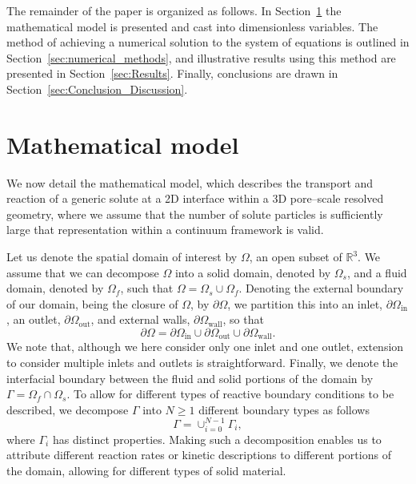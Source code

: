 \documentclass[preprint, 1p, authoryear]{elsarticle}
\begin{document}
The remainder of the paper is organized as follows. In Section~\ref{sec:Mathematical_Model} the 
mathematical model is presented and cast into dimensionless variables. The method of achieving a 
numerical solution to the system of equations is outlined in Section~\ref{sec:numerical_methods}, and 
illustrative results using this method are presented in Section~\ref{sec:Results}.  Finally, conclusions are drawn in 
Section~\ref{sec:Conclusion_Discussion}.

\section{Mathematical model}
\label{sec:Mathematical_Model}
We now detail  the mathematical model, which describes the transport and reaction of a generic solute at a 2D interface within a 3D pore--scale resolved geometry, where we assume that the number of solute particles is sufficiently large  that representation within a continuum framework is valid. 



Let us denote the spatial domain of interest by $\Omega$, an open subset of $\mathbb{R}^3$. We assume that we can decompose $\Omega$ into a solid domain, denoted by $\Omega_s$, and a fluid domain, denoted by $\Omega_f$, such that   $\Omega = \Omega_s \cup \Omega_f$. Denoting the  external boundary of our domain, being the closure of $\Omega$, by $\partial \Omega$, we partition this into an inlet, $\partial \Omega_{\text{in}}$, an outlet, $\partial \Omega_{\text{out}}$,  and  external walls, $\partial\Omega_{\text{wall}}$,  so that
\begin{equation}
\partial \Omega = \partial \Omega_{\text{in}} \cup \partial \Omega_{\text{out}} \cup \partial \Omega_{\text{wall}} .
\end{equation}
We note that, although we here consider only one inlet and one outlet, extension to consider multiple inlets and outlets 
 is straightforward. Finally, we denote the interfacial boundary between the fluid and solid portions of the domain by $\Gamma = \Omega_f \cap \Omega_s$. To allow for different types of reactive boundary conditions to be described, we decompose $\Gamma$ into $N \geq 1$  different boundary types as follows
\begin{equation}
\Gamma = \cup_{i=0}^{N-1} \Gamma_i ,
\end{equation}
where $\Gamma_i$ has distinct properties. Making such a decomposition enables us to attribute different reaction rates or kinetic descriptions to different portions of the domain, allowing for different types of solid material. 
\end{document}
